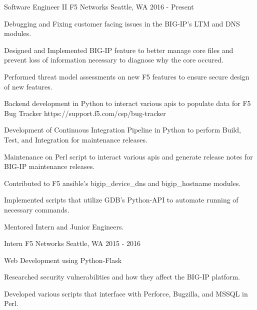 

\begin{cventries}

  \cventry
    {Software Engineer II} %
    {F5 Networks} %
    {Seattle, WA} %
    {2016 - Present} %
    {
      \begin{cvitems} %
        \item {Debugging and Fixing customer facing issues in the BIG-IP's LTM and DNS modules.}
        \item {Designed and Implemented BIG-IP feature to better manage core files and prevent loss of information necessary to diagnose why the core occured.}
        \item {Performed threat model assessments on new F5 features to ensure secure design of new features.}
        \item {Backend development in Python to interact various apis to populate data for F5 Bug Tracker https://support.f5.com/csp/bug-tracker}
        \item {Development of Continuous Integration Pipeline in Python to perform Build, Test, and Integration for maintenance releases.}
        \item {Maintenance on Perl script to interact various apis and generate release notes for BIG-IP maintenance releases.}
        \item {Contributed to F5 ansible's bigip\_device\_dns and bigip\_hostname modules.}
        \item {Implemented scripts that utilize GDB's Python-API to automate running of necessary commands.}
        \item {Mentored Intern and Junior Engineers.}
      \end{cvitems}
    }

  \cventry
    {Intern} %
    {F5 Networks} %
    {Seattle, WA} %
    {2015 - 2016} %
    {
      \begin{cvitems} %
        \item {Web Development using Python-Flask}
        \item {Researched security vulnerabilities and how they affect the BIG-IP platform.}
        \item {Developed various scripts that interface with Perforce, Bugzilla, and MSSQL in Perl.}
      \end{cvitems}
    }


\end{cventries}
